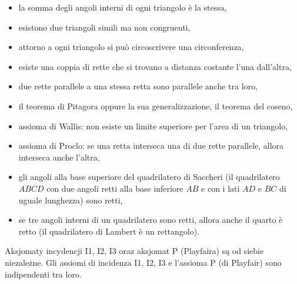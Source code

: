\begin{itemize}
    \item la somma degli angoli interni di ogni triangolo è la stessa,%
    \item esistono due triangoli simili ma non congruenti,%
    \item attorno a ogni triangolo si può circoscrivere una circonferenza,%
    \item esiste una coppia di rette che si trovano a distanza costante l'una dall'altra, %
    \item due rette parallele a una stessa retta sono parallele anche tra loro,%
    \item il teorema di Pitagora oppure la sua generalizzazione, il teorema del coseno,%
    \item assioma di Wallis: non esiste un limite superiore per l'area di un triangolo,%
    \item assioma di Proclo: se una retta interseca una di due rette parallele, allora interseca anche l'altra,%
    \item gli angoli alla base superiore del quadrilatero di Saccheri (il quadrilatero $ABCD$ con due angoli retti alla base inferiore $AB$ e con i lati $AD$ e $BC$ di uguale lunghezza) sono retti,%
    \item se tre angoli interni di un quadrilatero sono retti, allora anche il quarto è retto (il quadrilatero di Lambert è un rettangolo).%
\end{itemize}


\begin{proposition}
    Aksjomaty incydencji I1, I2, I3 oraz aksjomat P (Playfaira) są od siebie niezależne. %
    Gli assiomi di incidenza I1, I2, I3 e l'assioma P (di Playfair) sono indipendenti tra loro. %
\end{proposition}

